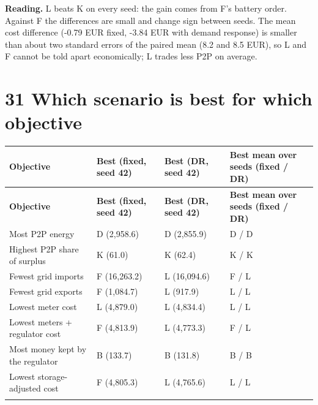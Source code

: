 \documentclass[a4paper,11pt]{article}
\begin{document}
\textbf{Reading.} L beats K on every seed: the gain comes from F's battery order. Against F the differences are small and change sign between seeds. The mean cost difference (-0.79 EUR fixed, -3.84 EUR with demand response) is smaller than about two standard errors of the paired mean (8.2 and 8.5 EUR), so L and F cannot be told apart economically; L trades less P2P on average.
\par\medskip

\clearpage

\section*{31  Which scenario is best for which objective}
\par\medskip

\begingroup\small
\begin{longtable}{>{\RaggedRight\arraybackslash}p{}>{\RaggedRight\arraybackslash}p{}>{\RaggedRight\arraybackslash}p{}>{\RaggedRight\arraybackslash}p{}}
\toprule
\textbf{Objective} & \textbf{Best (fixed, seed 42)} & \textbf{Best (DR, seed 42)} & \textbf{Best mean over seeds (fixed / DR)} \\ \midrule
\endfirsthead
\toprule
\textbf{Objective} & \textbf{Best (fixed, seed 42)} & \textbf{Best (DR, seed 42)} & \textbf{Best mean over seeds (fixed / DR)} \\ \midrule
\endhead
Most P2P energy & D (2,958.6) & D (2,855.9) & D / D \\ \addlinespace[3pt]
Highest P2P share of surplus & K (61.0) & K (62.4) & K / K \\ \addlinespace[3pt]
Fewest grid imports & F (16,263.2) & L (16,094.6) & F / L \\ \addlinespace[3pt]
Fewest grid exports & F (1,084.7) & L (917.9) & L / L \\ \addlinespace[3pt]
Lowest meter cost & L (4,879.0) & L (4,834.4) & L / L \\ \addlinespace[3pt]
Lowest meters + regulator cost & F (4,813.9) & L (4,773.3) & F / L \\ \addlinespace[3pt]
Most money kept by the regulator & B (133.7) & B (131.8) & B / B \\ \addlinespace[3pt]
Lowest storage-adjusted cost & F (4,805.3) & L (4,765.6) & L / L \\ \addlinespace[3pt]
\bottomrule
\end{longtable}
\endgroup
\end{document}
